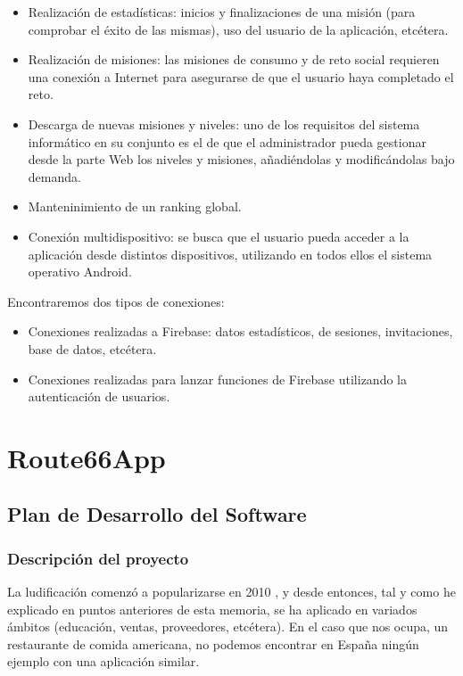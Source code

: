 \documentclass[twoside]{report}
\begin{document}
\begin{itemize}
\item Realización de estadísticas: inicios y finalizaciones de una misión (para comprobar el éxito de las mismas), uso del usuario de la aplicación, etcétera.

\item Realización de misiones: las misiones de consumo y de reto social requieren una conexión a Internet para asegurarse de que el usuario haya completado el reto.

\item Descarga de nuevas misiones y niveles: uno de los requisitos del sistema informático en su conjunto es el de que el administrador pueda gestionar desde la parte Web los niveles y misiones, añadiéndolas y modificándolas bajo demanda.

\item Manteninimiento de un ranking global.

\item Conexión multidispositivo: se busca que el usuario pueda acceder a la aplicación desde distintos dispositivos, utilizando en todos ellos el sistema operativo Android.
\end{itemize}

Encontraremos dos tipos de conexiones:

\begin{itemize}
\item Conexiones realizadas a Firebase: datos estadísticos, de sesiones, invitaciones, base de datos, etcétera.

\item Conexiones realizadas para lanzar funciones de Firebase utilizando la autenticación de usuarios.

\end{itemize}


\chapter{Route66App}
\section{Plan de Desarrollo del Software}
\subsection{Descripción del proyecto}

La ludificación comenzó a popularizarse en 2010 \cite{anatfg}, y desde entonces, tal y como he explicado en puntos anteriores de esta memoria, se ha aplicado en variados ámbitos (educación, ventas, proveedores, etcétera). En el caso que nos ocupa, un restaurante de comida americana, no podemos encontrar en España ningún ejemplo  con una aplicación similar.
\end{document}
